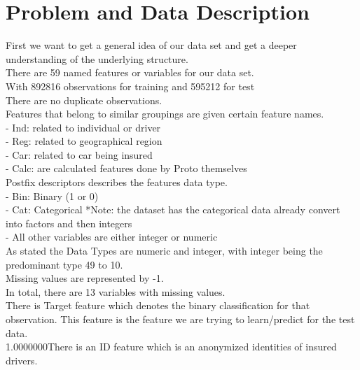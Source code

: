 \documentclass[fleqn,10pt]{SelfArx} %
\affiliation{\textsuperscript{1}\textit{Computer Science, School of Informatics , Computing and Engineering, Indiana University, Bloomington, IN, USA}} %
\begin{document}
\flushbottom %

\maketitle %

\tableofcontents %

\thispagestyle{empty} %






\section{Problem and Data Description} %




First we want to get a general idea of our data set and get a deeper understanding of the underlying structure.\\
There are 59 named features or variables for our data set. \\
With 892816 observations for training and 595212 for test\\
There are no duplicate observations. \\
Features that belong to similar groupings are given certain feature names.\\
- Ind: related to individual or driver\\
- Reg: related to geographical region\\
- Car: related to car being insured\\
- Calc: are calculated features done by Proto themselves\\
Postfix descriptors describes the features data type.\\
- Bin: Binary (1 or 0)\\
- Cat: Categorical *Note: the dataset has the categorical data already convert into factors and then integers\\
- All other variables are either integer or numeric\\
As stated the Data Types are numeric and integer, with integer being the predominant type 49 to 10.\\
Missing values are represented by -1.\\
In total, there are 13 variables with missing values.\\
There is Target feature which denotes the binary classification for that observation. This feature is the feature we are trying to learn/predict for the test data.\\
1.0000000There is an ID feature which is an anonymized identities of insured drivers.  \\
\end{document}
